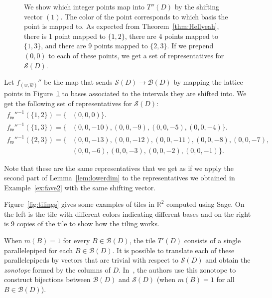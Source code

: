 \documentclass[ALCO,ThmDefs,Unicode,epreuves]{cedram}
\newcommand{\R}{\mathbb{R}}
\newcommand{\B}{\mathcal{B}}
\newcommand{\Sand}{\mathcal{S}}
\newcommand{\w}{\mathfrak w}
\begin{document}
\begin{exam}
\begin{figure}[htb]
{}
\caption{We show which integer points map into $T''(D)$ by the shifting vector $(1)$. The color of the point corresponds to which basis the point is mapped to. As expected from Theorem~\ref{thm:Hellyeah}, there is 1 point mapped to $\{1,2\}$, there are 4 points mapped to $\{1,3\}$, and there are 9 points mapped to $\{2,3\}$. If we prepend $(0,0)$ to each of these points, we get a set of representatives for $\Sand(D)$.} 
\label{fig:1dbij}
\end{figure}

Let $f_{(w,\widehat w)}''$ be the map that sends $\Sand(D) \to \B(D)$ by mapping the lattice points in Figure~\ref{fig:1dbij} to bases associated to the intervals they are shifted into. We get the following set of representatives for $\Sand(D)$:
\begin{align*}
f_{\w}''^{-1}(\{1,2\}) = \{&(0,0,0)\}.\\
f_{\w}''^{-1}(\{1,3\}) = \{&(0,0,-10),(0,0,-9),(0,0,-5),(0,0,-4)\}.\\
f_{\w}''^{-1}(\{2,3\}) = \{&(0,0,-13),(0,0,-12),(0,0,-11),(0,0,-8),(0,0,-7),\\
&(0,0,-6),(0,0,-3),(0,0,-2),(0,0,-1)\}.
\end{align*}
\end{exam}

Note that these are the same representatives that we get as if we apply the second part of Lemma~\ref{lem:lowerdim} to the representatives we obtained in Example~\ref{ex:fave2} with the same shifting vector. 

Figure~\ref{fig:tilings} gives some examples of tiles in $\R^2$ computed using Sage. On the left is the tile with different colors indicating different bases and on the right is 9 copies of the tile to show how the tiling works. 

\begin{rema}
When $m(B) = 1$ for every $B \in \B(D)$, the tile $T'(D)$ consists of a single parallelepiped for each $B \in \B(D)$. It is possible to translate each of these parallelepipeds by vectors that are trivial with respect to $\Sand(D)$ and obtain the \emph{zonotope} formed by the columns of $D$. In~\cite{BBY}, the authors use this zonotope to construct bijections between $\B(D)$ and $\Sand(D)$ (when $m(B) = 1$ for all $B \in \B(D)$). 
\end{rema}
\end{document}
